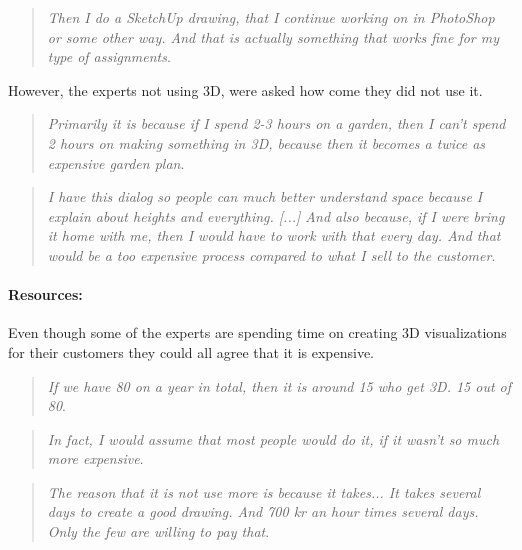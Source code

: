 		\begin{quote}
			\textit{Then I do a SketchUp drawing, that I continue working on in PhotoShop or some other way. And that is actually something that works fine for my type of assignments}\label{quote:expertTech2}.\\
		\end{quote}
		However, the experts not using 3D, were asked how come they did not use it.
		\begin{quote}
			\textit{Primarily it is because if I spend 2-3 hours on a garden, then I can't spend 2 hours on making something in 3D, because then it becomes a twice as expensive garden plan}\label{quote:expertTech3}.\\
		\end{quote}
		\begin{quote}
			\textit{I have this dialog so people can much better understand space because I explain about heights and everything. [...] And also because, if I were bring it home with me, then I would have to work with that every day. And that would be a too expensive process compared to what I sell to the customer}\label{quote:expertTech4}.\\
		\end{quote}

		\paragraph*{Resources:}

		Even though some of the experts are spending time on creating 3D visualizations for their customers they could all agree that it is expensive.
		\begin{quote}
			\textit{If we have 80 on a year in total, then it is around 15 who get 3D. 15 out of 80}\label{quote:expertRessources1}.\\
		\end{quote}
		
		\begin{quote}
			\textit{In fact, I would assume that most people would do it, if it wasn't so much more expensive}\label{quote:expertRessources2}.\\
		\end{quote}

		\begin{quote}
			\textit{The reason that it is not use more is because it takes... It takes several days to create a good drawing. And 700 kr an hour times several days. Only the few are willing to pay that}\label{quote:expertRessources3}.\\
		\end{quote}
		
